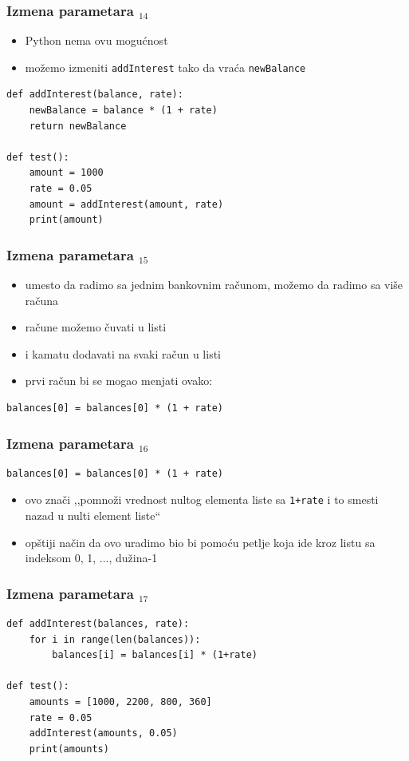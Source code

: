 \documentclass[utf8,compress]{beamer}
\begin{document}
\begin{frame}[fragile]
  \frametitle{Izmena parametara $_{14}$}
  \begin{itemize}
    \item Python nema ovu mogućnost
    \item možemo izmeniti \texttt{addInterest} tako da vraća \texttt{newBalance}
  \end{itemize}
\begin{verbatim}
def addInterest(balance, rate):
    newBalance = balance * (1 + rate)
    return newBalance

def test():
    amount = 1000
    rate = 0.05
    amount = addInterest(amount, rate)
    print(amount)
\end{verbatim}
\end{frame}

\begin{frame}[fragile]
  \frametitle{Izmena parametara $_{15}$}
  \begin{itemize}
    \item umesto da radimo sa jednim bankovnim računom, možemo da radimo sa više računa
    \item račune možemo čuvati u listi
    \item i kamatu dodavati na svaki račun u listi
    \item prvi račun bi se mogao menjati ovako:
  \end{itemize}
\begin{verbatim}
balances[0] = balances[0] * (1 + rate)
\end{verbatim}
\end{frame}

\begin{frame}[fragile]
  \frametitle{Izmena parametara $_{16}$}
\begin{verbatim}
balances[0] = balances[0] * (1 + rate)
\end{verbatim}
  \begin{itemize}
    \item ovo znači ,,pomnoži vrednost nultog elementa liste sa \texttt{1+rate} i to smesti nazad u nulti element liste``
    \item opštiji način da ovo uradimo bio bi pomoću petlje koja ide kroz listu sa indeksom 0, 1, ..., dužina-1
  \end{itemize}
\end{frame}

\begin{frame}[fragile]
  \frametitle{Izmena parametara $_{17}$}
\begin{verbatim}
def addInterest(balances, rate):
    for i in range(len(balances)):
        balances[i] = balances[i] * (1+rate)

def test():
    amounts = [1000, 2200, 800, 360]
    rate = 0.05
    addInterest(amounts, 0.05)
    print(amounts)
\end{verbatim}
\end{frame}
\end{document}
